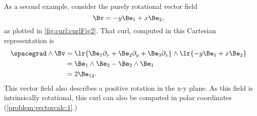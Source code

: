 As a second example, consider the purely rotational vector field
\begin{equation}\label{eqn:vectorcalc:1090}
\Bv = -y \Be_1 + x \Be_2,
\end{equation}
as plotted in \cref{fig:curl:curlFig2}.
That curl, computed in this Cartesian representation is
\begin{equation}\label{eqn:vectorcalc:1110}
\begin{aligned}
\spacegrad \wedge \Bv
&=
\lr{ \Be_1 \partial_x + \Be_2 \partial_y + \Be_3 \partial_z } \wedge \lr{ -y \Be_1 + x \Be_2 } \\
&=
\Be_1 \wedge \Be_2 - \Be_2 \wedge \Be_1 \\
&=
2 \Be_{12}.
\end{aligned}
\end{equation}
This vector field also describes a positive rotation in the x-y plane.
As this field is intrinsically rotational, this curl can also be computed in polar coordinates (\cref{problem:vectorcalc:1}.)

